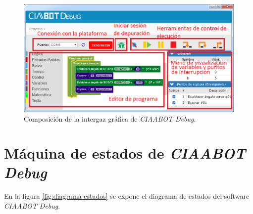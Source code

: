 \begin{figure}[!htbp]
	\begin{center}  %
		\includegraphics[width=15cm]{./Figures/CIAABOT-DEBUG-GUI-3.png}
		\par\caption{Composición de la intergaz gráfica de \emph{CIAABOT Debug}.}\label{fig:debug-modos}
	\end{center}
\end{figure}


\section{Máquina de estados de \emph{CIAABOT Debug}}
\label{sec:Modos de funcionamiento}

En la figura \ref{fig:diagrama-estados} se expone el diagrama de estados del software \emph{CIAABOT Debug}.


